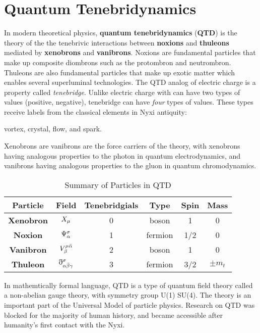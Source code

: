 \chapter{Quantum Tenebridynamics}
In modern theoretical physics, \textbf{quantum tenebridynamics} (\textbf{QTD}) is the theory of the the tenebrivic interactions between \textbf{noxions} and \textbf{thuleons} mediated by \textbf{xenobrons} and \textbf{vanibrons}. Noxions are fundamental particles that make up composite diombrons such as the protombron and neutrombron. Thuleons are also fundamental particles that make up exotic matter which enables several superluminal technologies. The QTD analog of electric charge is a property called \textit{tenebridge}. Unlike electric charge with can have two types of values (positive, negative), tenebridge can have \textit{four} types of values. These types receive labels from the classical elements in Nyxi antiquity:
\begin{center}vortex, crystal, flow, and spark.\end{center}

Xenobrons are vanibrons are the force carriers of the theory, with xenobrons having analogous properties to the photon in quantum electrodynamics, and vanibrons having analogous properties to the gluon in quantum chromodynamics.
\begin{table}[ht]\label{QTDParticles}
  \centering
  \begin{tabular}{c c c c c c}
    \toprule
    \textbf{Particle} & \textbf{Field}                             & \textbf{Tenebridgials} & \textbf{Type} & \textbf{Spin} & \textbf{Mass} \\
    \midrule
    \textbf{Xenobron} & $X_{\mu}$                           & 0                      & boson         & 1             & 0             \\[10pt]
    \textbf{Noxion}   & $\Psi^{\sigma}_{\alpha}$                & 1                      & fermion       & 1/2           & 0             \\[10pt]
    \textbf{Vanibron} & $V^{\mu \bar{\alpha}}_{\beta}$            & 2                      & boson         & 1             & 0             \\[10pt]
    \textbf{Thuleon}  & $\eth^{\sigma}_{\alpha \bar{\beta} \gamma}$ & 3                      & fermion       & 3/2           & $\pm m_{t}$   \\
    \bottomrule
  \end{tabular}
  \caption{Summary of Particles in QTD}
\end{table}
In mathemtically formal language, QTD is a type of quantum field theory called a non-abelian gauge theory, with symmetry group U(1) \texttimes SU(4). The theory is an important part of the Universal Model of particle physics. Research on QTD was blocked for the majority of human history, and became accessible after humanity's first contact with the Nyxi.

